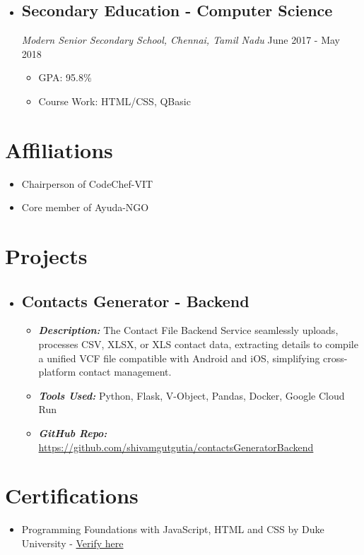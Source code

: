 \documentclass[a4paper,10pt]{article}
\begin{document}
\begin{itemize}
\item
\subsection*{\large\textbf{Secondary Education - Computer Science}}
\textit{Modern Senior Secondary School, Chennai, Tamil Nadu} \hfill June 2017 - May 2018
\begin{itemize}[label=\textasteriskcentered , leftmargin=*,topsep=0pt]
    \item GPA: 95.8\%
    \item Course Work: HTML/CSS, QBasic
\end{itemize}
\end{itemize}

\section*{Affiliations}
\begin{itemize}
    \item Chairperson of CodeChef-VIT
    \item Core member of Ayuda-NGO
\end{itemize}

\section*{Projects}

\begin{itemize}
\item 
\subsection*{\large\textbf{Contacts Generator - Backend}}
\begin{itemize}[label=\textasteriskcentered , leftmargin=*,topsep=0pt]
    \item \textbf{\textit{Description:}} The Contact File Backend Service seamlessly uploads, processes CSV, XLSX, or XLS contact data, extracting details to compile a unified VCF file compatible with Android and iOS, simplifying cross-platform contact management.
    \item \textbf{\textit{Tools Used:}} Python, Flask, V-Object, Pandas, Docker, Google Cloud Run
    \item \textbf{\textit{GitHub Repo:} }\href{https://github.com/shivamgutgutia/contactsGeneratorBackend}{\textcolor{blue!80!white}{https://github.com/shivamgutgutia/contactsGeneratorBackend} {\faHandPointLeft}}
\end{itemize}
\end{itemize}

\section*{Certifications}
\begin{itemize}
    \item Programming Foundations with JavaScript, HTML and CSS by Duke University - 
    \href{https://coursera.org/verify/ZZVTGPTSR36H}{\textcolor{blue!80!white}{Verify here}} {\faHandPointLeft}
\end{itemize}
\end{document}
